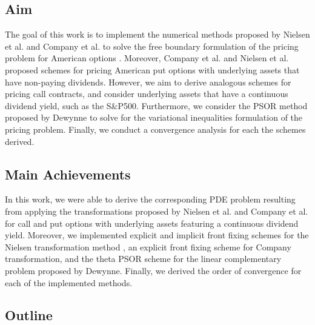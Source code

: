 \subsection{Aim} 

The goal of this work is to implement the numerical methods proposed by Nielsen et al. \cite{nielsen_2001} and Company et al.\cite{company_egorova_jodar_2014} to solve the free boundary formulation of the pricing problem for American options \cite{dewynne_howison_rupf_wilmott_1993}. Moreover, Company et al. \cite{company_egorova_jodar_2014} and Nielsen et al.\cite{nielsen_2001} proposed schemes for pricing American put options with underlying assets that have non-paying dividends. However, we aim to derive analogous schemes for pricing call contracts, and consider underlying assets that have a continuous dividend yield, such as the S\&P500.  Furthermore, we consider the PSOR method proposed by Dewynne\cite{dewynne_howison_rupf_wilmott_1993}\cite{dewynne_howison_wilmott_howison_1995} to solve for the variational inequalities formulation of the pricing problem. Finally, we conduct a convergence analysis for each the schemes derived.

\subsection{Main Achievements}

In this work, we were able to derive the corresponding PDE problem resulting from applying the transformations proposed by Nielsen et al.\cite{nielsen_2001} and Company et al.\cite{company_egorova_jodar_2014} for call and put options with underlying assets featuring a continuous dividend yield. Moreover, we implemented explicit and implicit front fixing schemes for the Nielsen transformation method \cite{nielsen_2001}, an explicit front fixing scheme for Company transformation, and the theta PSOR scheme for the linear complementary problem proposed by Dewynne\cite{dewynne_howison_wilmott_howison_1995}. Finally, we derived the order of convergence for each of the implemented methods.

\subsection{Outline}

